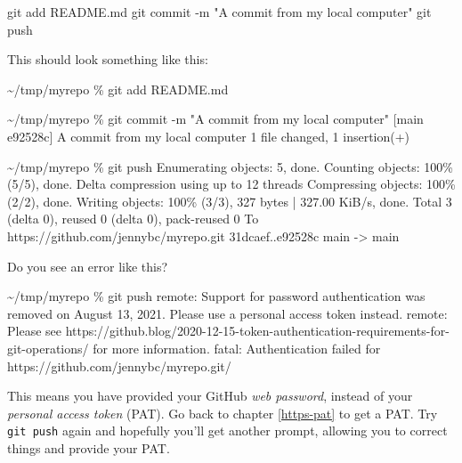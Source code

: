 \documentclass[
]{book}
\newenvironment{Shaded}{\begin{snugshade}}{\end{snugshade}}
\newcommand{\NormalTok}[1]{#1}
\begin{document}
\begin{Shaded}
\begin{Highlighting}[]
\NormalTok{git add README.md}
\NormalTok{git commit {-}m "A commit from my local computer"}
\NormalTok{git push}
\end{Highlighting}
\end{Shaded}

This should look something like this:

\begin{Shaded}
\begin{Highlighting}[]
\NormalTok{\textasciitilde{}/tmp/myrepo \% git add README.md}

\NormalTok{\textasciitilde{}/tmp/myrepo \% git commit {-}m "A commit from my local computer"}
\NormalTok{[main e92528c] A commit from my local computer}
\NormalTok{ 1 file changed, 1 insertion(+)}
 
\NormalTok{\textasciitilde{}/tmp/myrepo \% git push}
\NormalTok{Enumerating objects: 5, done.}
\NormalTok{Counting objects: 100\% (5/5), done.}
\NormalTok{Delta compression using up to 12 threads}
\NormalTok{Compressing objects: 100\% (2/2), done.}
\NormalTok{Writing objects: 100\% (3/3), 327 bytes | 327.00 KiB/s, done.}
\NormalTok{Total 3 (delta 0), reused 0 (delta 0), pack{-}reused 0}
\NormalTok{To https://github.com/jennybc/myrepo.git}
\NormalTok{   31dcaef..e92528c  main {-}\textgreater{} main}
\end{Highlighting}
\end{Shaded}

Do you see an error like this?

\begin{Shaded}
\begin{Highlighting}[]
\NormalTok{\textasciitilde{}/tmp/myrepo \% git push                                                     }
\NormalTok{remote: Support for password authentication was removed on August 13, 2021. Please use a personal access token instead.}
\NormalTok{remote: Please see https://github.blog/2020{-}12{-}15{-}token{-}authentication{-}requirements{-}for{-}git{-}operations/ for more information.}
\NormalTok{fatal: Authentication failed for \textquotesingle{}https://github.com/jennybc/myrepo.git/\textquotesingle{}}
\end{Highlighting}
\end{Shaded}

This means you have provided your GitHub \emph{web password}, instead of your \emph{personal access token} (PAT).
Go back to chapter \ref{https-pat} to get a PAT.
Try \texttt{git\ push} again and hopefully you'll get another prompt, allowing you to correct things and provide your PAT.
\end{document}
